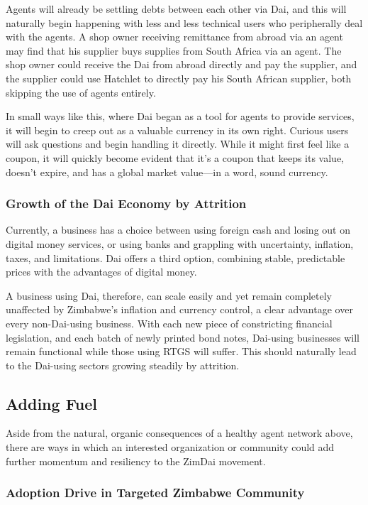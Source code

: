 \documentclass{article}
\begin{document}
Agents will already be settling debts between each other via Dai, and this will naturally begin happening with less and less technical users who peripherally deal with the agents. A shop owner receiving remittance from abroad via an agent may find that his supplier buys supplies from South Africa via an agent. The shop owner could receive the Dai from abroad directly and pay the supplier, and the supplier could use Hatchlet to directly pay his South African supplier, both skipping the use of agents entirely.

In small ways like this, where Dai began as a tool for agents to provide services, it will begin to creep out as a valuable currency in its own right. Curious users will ask questions and begin handling it directly. While it might first feel like a coupon, it will quickly become evident that it's a coupon that keeps its value, doesn't expire, and has a global market value---in a word, sound currency.

\subsubsection{Growth of the Dai Economy by Attrition} \label{fittest}

Currently, a business has a choice between using foreign cash and losing out on digital money services, or using banks and grappling with uncertainty, inflation, taxes, and limitations. Dai offers a third option, combining stable, predictable prices with the advantages of digital money.

A business using Dai, therefore, can scale easily and yet remain completely unaffected by Zimbabwe's inflation and currency control, a clear advantage over every non-Dai-using business. With each new piece of constricting financial legislation, and each batch of newly printed bond notes, Dai-using businesses will remain functional while those using RTGS will suffer. This should naturally lead to the Dai-using sectors growing steadily by attrition.

\subsection{Adding Fuel} \label{fuel}

Aside from the natural, organic consequences of a healthy agent network above, there are ways in which an interested organization or community could add further momentum and resiliency to the ZimDai movement.

\subsubsection{Adoption Drive in Targeted Zimbabwe Community} \label{targeted community}
\end{document}
